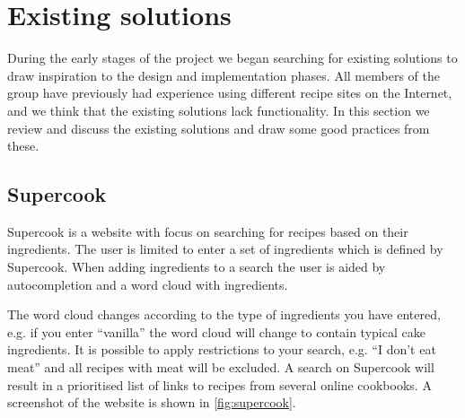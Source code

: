 \section{Existing solutions}\label{sec:exist}

During the early stages of the project we began searching for existing solutions to draw inspiration to the design and implementation phases. All members of the group have previously had experience using different recipe sites on the Internet, and we  think that the existing solutions lack functionality. In this section we review and discuss the existing solutions and draw some good practices from these.

\subsection{Supercook}
Supercook\cite{supercook} is a website with focus on searching for recipes based on their ingredients. The user is limited to enter a set of ingredients which is defined by Supercook. When adding ingredients to a search the user is aided by autocompletion and a word cloud with ingredients.

The word cloud changes according to the type of ingredients you have entered, e.g. if you enter ``vanilla'' the word cloud will change to contain typical cake ingredients. It is possible to apply restrictions to your search, e.g. ``I don't eat meat'' and all recipes with meat will be excluded. A search on Supercook will result in a prioritised list of links to recipes from several online cookbooks. A screenshot of the website is shown in \autoref{fig:supercook}.

